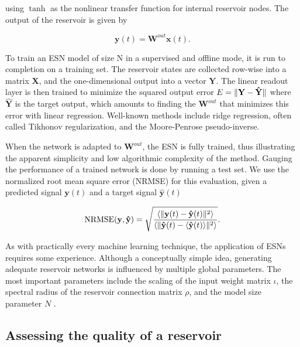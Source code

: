 \noindent using $\tanh$ as the nonlinear transfer function for internal
reservoir nodes. The output of the reservoir is given by

\begin{equation}
  \mathbf{y}(t) =
    \mathbf{W}^{out}\mathbf{x}(t).
  \label{yt}
\end{equation}

To train an ESN model of size N in a supervised and offline mode, it is run to
completion on a training set. The reservoir states are collected row-wise into a
matrix $\mathbf{X}$, and the one-dimensional output into a vector
$\mathbf{Y}$. The linear readout layer is then trained to minimize the squared
output error $E = \Vert \mathbf{Y} - \mathbf{\hat{Y}} \Vert$ where $\mathbf{\hat{Y}}$
is the target output, which amounts to finding the $\mathbf{W}^{out}$ that
minimizes this error with linear regression. Well-known methods include ridge
regression, often called Tikhonov regularization, and the Moore-Penrose
pseudo-inverse.

When the network is adapted to $\mathbf{W}^{out}$, the ESN is fully trained,
thus illustrating the apparent simplicity and low algorithmic complexity of the
method. Gauging the performance of a trained network is done by running a test
set. We use the normalized root mean square error (NRMSE) for this evaluation,
given a predicted signal $\mathbf{y}(t)$ and a target signal
$\mathbf{\hat{y}}(t)$

\begin{equation}
  \textrm{NRMSE}(\mathbf{y}, \mathbf{\hat{y}}) = \sqrt{\frac{
      \langle\Vert \mathbf{y}(t) - \mathbf{\hat{y}}(t) \Vert^{2}\rangle
    }{
      \langle\Vert \mathbf{\hat{y}}(t) - \langle\mathbf{\hat{y}}(t)\rangle \Vert^{2}\rangle
    }
  }
  .
  \label{nrmse}
\end{equation}

As with practically every machine learning technique, the application of ESNs
requires some experience. Although a conceptually simple idea, generating
adequate reservoir networks is influenced by multiple global parameters. The
most important parameters include the scaling of the input weight matrix
$\iota$, the spectral radius of the reservoir connection matrix $\rho$, and the
model size parameter $N$ \cite{montavon_practical_2012, jaeger_tutorial_nodate}.

\subsection{Assessing the quality of a reservoir}


